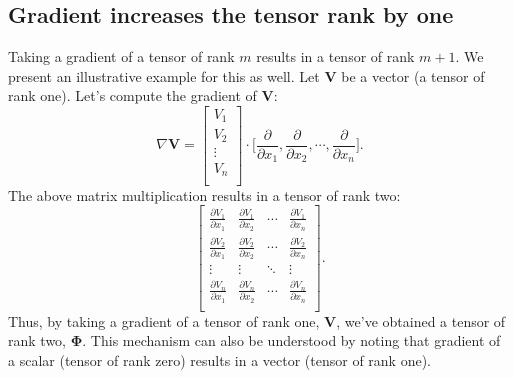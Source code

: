\documentclass[10pt,twocolumn]{article}
\begin{document}
\subsection*{Gradient increases the tensor rank by one}

Taking a gradient of a tensor of rank $m$ results in a tensor of rank $m+1$. We present an illustrative example for this as well.
Let $\mathbf{V}$ be a vector (a tensor of rank one). Let's compute the gradient of $\mathbf{V}$:
\begin{equation*}
  \nabla \mathbf{V} =
  \begin{bmatrix}
  V_1 \\
  V_2 \\
  \vdots \\
  V_n \\
  \end{bmatrix}
  \cdot 
  \Big[ \frac{\partial}{\partial x_1} , \frac{\partial}{\partial x_2}, \cdots , \frac{\partial}{\partial x_n} \Big].
\end{equation*}
The above matrix multiplication results in a tensor of rank two:
\begin{equation*}
  \begin{bmatrix}
  \frac{\partial V_1}{\partial x_1} & \frac{\partial V_1}{\partial x_2} & \cdots & \frac{\partial V_1}{\partial x_n} \\
  \frac{\partial V_2}{\partial x_1} & \frac{\partial V_2}{\partial x_2} & \cdots & \frac{\partial V_2}{\partial x_n} \\
  \vdots & \vdots & \ddots & \vdots \\
  \frac{\partial V_n}{\partial x_1} & \frac{\partial V_n}{\partial x_2} & \cdots & \frac{\partial V_n}{\partial x_n} \\
  \end{bmatrix}.
\end{equation*}
Thus, by taking a gradient of a tensor of rank one, $\mathbf{V}$, we've obtained a tensor of rank two, $\pmb{\Phi}$. This mechanism can also be understood by noting that gradient of a scalar (tensor of rank zero) results in a vector (tensor of rank one).


\end{document}
